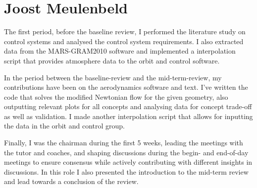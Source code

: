 \section{Joost Meulenbeld}

The first period, before the baseline review, I performed the literature study on control systems and analysed the control system requirements. I also extracted data from the MARS-GRAM2010 software and implemented a interpolation script that provides atmosphere data to the orbit and control software.

In the period between the baseline-review and the mid-term-review, my contributions have been on the aerodynamics software and text. I've written the code that solves the modified Newtonian flow for the given geometry, also outputting relevant plots for all concepts and analysing data for concept trade-off as well as validation. I made another interpolation script that allows for inputting the data in the orbit and control group.

Finally, I was the chairman during the first 5 weeks, leading the meetings with the tutor and coaches, and shaping discussions during the begin- and end-of-day meetings to ensure consensus while actively contributing with different insights in discussions. In this role I also presented the introduction to the mid-term review and lead towards a conclusion of the review.
